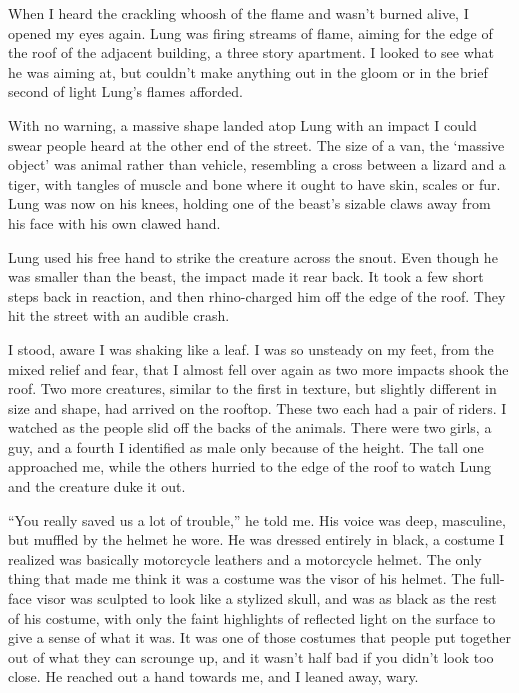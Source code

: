 When I heard the crackling whoosh of the flame and wasn't burned alive, I opened my eyes again.  Lung was firing streams of flame, aiming for the edge of the roof of the adjacent building, a three story apartment.  I looked to see what he was aiming at, but couldn't make anything out in the gloom or in the brief second of light Lung's flames afforded.



With no warning, a massive shape landed atop Lung with an impact I could swear people heard at the other end of the street.  The size of a van, the `massive object' was animal rather than vehicle, resembling a cross between a lizard and a tiger, with tangles of muscle and bone where it ought to have skin, scales or fur.  Lung was now on his knees, holding one of the beast's sizable claws away from his face with his own clawed hand.



Lung used his free hand to strike the creature across the snout.  Even though he was smaller than the beast, the impact made it rear back.  It took a few short steps back in reaction, and then rhino-charged him off the edge of the roof.  They hit the street with an audible crash.



I stood, aware I was shaking like a leaf.  I was so unsteady on my feet, from the mixed relief and fear, that I almost fell over again as two more impacts shook the roof.  Two more creatures, similar to the first in texture, but slightly different in size and shape, had arrived on the rooftop.  These two each had a pair of riders.  I watched as the people slid off the backs of the animals.  There were two girls, a guy, and a fourth I identified as male only because of the height.  The tall one approached me, while the others hurried to the edge of the roof to watch Lung and the creature duke it out.



``You really saved us a lot of trouble,'' he told me.  His voice was deep, masculine, but muffled by the helmet he wore.  He was dressed entirely in black, a costume I realized was basically motorcycle leathers and a motorcycle helmet.  The only thing that made me think it was a costume was the visor of his helmet.  The full-face visor was sculpted to look like a stylized skull, and was as black as the rest of his costume, with only the faint highlights of reflected light on the surface to give a sense of what it was.  It was one of those costumes that people put together out of what they can scrounge up, and it wasn't half bad if you didn't look too close.  He reached out a hand towards me, and I leaned away, wary.



